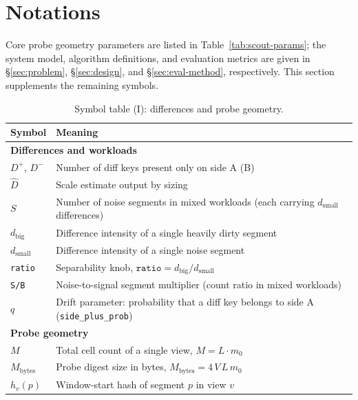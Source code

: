 \section{Notations}
\label{sec:notations}

Core probe geometry parameters are listed in Table~\ref{tab:scout-params}; the system model, algorithm definitions, and evaluation metrics are given in \S\ref{sec:problem}, \S\ref{sec:design}, and \S\ref{sec:eval-method}, respectively. This section supplements the remaining symbols.

\begin{table}[!thbp]
\centering
\small
\begin{tabular}{lp{}}
\toprule
Symbol & Meaning \\
\midrule
\multicolumn{2}{l}{\textbf{Differences and workloads}} \\
$D^{+}$, $D^{-}$ & Number of diff keys present only on side A (B) \\
$\hat D$ & Scale estimate output by sizing \\
$S$ & Number of noise segments in mixed workloads (each carrying $d_{\text{small}}$ differences) \\
$d_{\text{big}}$ & Difference intensity of a single heavily dirty segment \\
$d_{\text{small}}$ & Difference intensity of a single noise segment \\
\texttt{ratio} & Separability knob, $\texttt{ratio}=d_{\text{big}}/d_{\text{small}}$ \\
\texttt{S/B} & Noise-to-signal segment multiplier (count ratio in mixed workloads) \\
$q$ & Drift parameter: probability that a diff key belongs to side A (\texttt{side\_plus\_prob}) \\
\midrule
\multicolumn{2}{l}{\textbf{Probe geometry}} \\
$M$ & Total cell count of a single view, $M=L\cdot m_0$ \\
$M_{\text{bytes}}$ & Probe digest size in bytes, $M_{\text{bytes}}=4\,V\,L\,m_0$ \\
$h_v(p)$ & Window-start hash of segment $p$ in view $v$ \\
\bottomrule
\end{tabular}
\caption{Symbol table (I): differences and probe geometry.}
\label{tab:notations-1}
\end{table}


